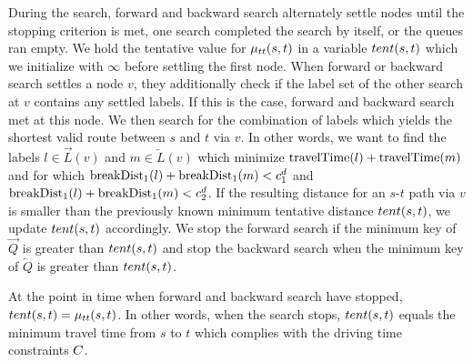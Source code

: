 During the search, forward and backward search alternately settle nodes until the stopping criterion is met, one search completed the search by itself, or the queues ran empty. We hold the tentative value for $\mu_{tt}(s,t)$ in a variable $tent(s,t)$ which we initialize with $\infty$ before settling the first node. When forward or backward search settles a node $v$, they additionally check if the label set of the other search at $v$ contains any settled labels. If this is the case, forward and backward search met at this node. We then search for the combination of labels which yields the shortest valid route between $s$ and $t$ via $v$. In other words, we want to find the labels $l \in \overrightarrow{L}(v)$ and $m \in \overleftarrow{L}(v)$ which minimize $\operatorname{travelTime}(l) + \operatorname{travelTime}(m)$ and for which $\operatorname{breakDist}_1(l) + \operatorname{breakDist}_1(m) < c_1^d$ and $\operatorname{breakDist}_1(l) + \operatorname{breakDist}_1(m) < c_2^d$. If the resulting distance for an $s$-$t$ path via $v$ is smaller than the previously known minimum tentative distance $tent(s,t)$, we update $tent(s,t)$ accordingly. We stop the forward search if the minimum key of $\overrightarrow{Q}$ is greater than $tent(s,t)$ and stop the backward search when the minimum key of $\overleftarrow{Q}$ is greater than $tent(s,t)$.

\begin{theorem}
	At the point in time when forward and backward search have stopped, $tent(s,t) = \mu_{tt}(s,t)$. In other words, when the search stops, $tent(s,t)$ equals the minimum travel time from $s$ to $t$ which complies with the driving time constraints $C$.
\end{theorem}

